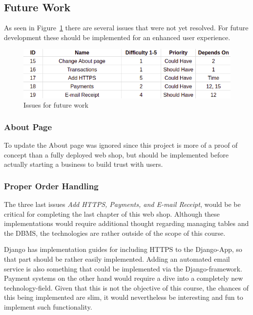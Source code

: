 \subsection{Future Work} 

As seen in Figure~\ref{fig:sprint_4} there are several issues that were
not yet resolved. For future development these should be implemented for an
enhanced user experience.

\begin{figure}[H]
\centering
\includegraphics[width=\textwidth]{third_sprint/other.png}
\caption{\label{fig:sprint_4} Issues for future work}
\end{figure}

\subsubsection{About Page}\label{sec:about}

To update the About page was ignored since this project is more of a proof
of concept than a fully deployed web shop, but should be implemented before
actually starting a business to build trust with users.



\subsubsection{Proper Order Handling}\label{sec:security}

The three last issues \textit{Add HTTPS, Payments, and E-mail Receipt}, would
be be critical for completing the last chapter of this web shop. Although these
implementations would require additional thought regarding managing tables
and the DBMS, the technologies are rather outside of the scope of this course.

Django has implementation guides for including HTTPS to the Django-App,
so that part should be rather easily implemented. Adding an automated email
service is also something that could be implemented via the Django-framework.
Payment systems on the other hand would require a dive into a completely
new technology-field. Given that this is not the objective of this course,
the chances of this being implemented are slim, it would nevertheless be
interesting and fun to implement such functionality.

